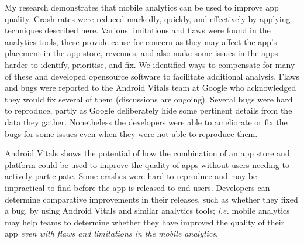 \begin{SingleSpace}
My research demonstrates that mobile analytics can be used to improve app quality. Crash rates were reduced markedly, quickly, and effectively by applying techniques described here. Various limitations and flaws were found in the analytics tools, these provide cause for concern as they may affect the app's placement in the app store, revenues, and also make some issues in the apps harder to identify, prioritise, and fix. We identified ways to compensate for many of these and developed opensource software to facilitate additional analysis. Flaws and bugs were reported to the Android Vitals team at Google who acknowledged they would fix several of them (discussions are ongoing).
Several bugs were hard to reproduce, partly as Google deliberately hide some pertinent details from the data they gather. Nonetheless the developers were able to ameliorate or fix the bugs for some issues even when they were not able to reproduce them.

Android Vitals shows the potential of how the combination of an app store and platform could be used to improve the quality of apps without users needing to actively participate. Some crashes were hard to reproduce and may be impractical to find before the app is released to end users. Developers can determine comparative improvements in their releases, such as whether they fixed a bug, by using Android Vitals and similar analytics tools; \textit{i.e.} mobile analytics may help teams to determine whether they have improved the quality of their app \textit{even with flaws and limitations in the mobile analytics}.
\end{SingleSpace}
\newpage
